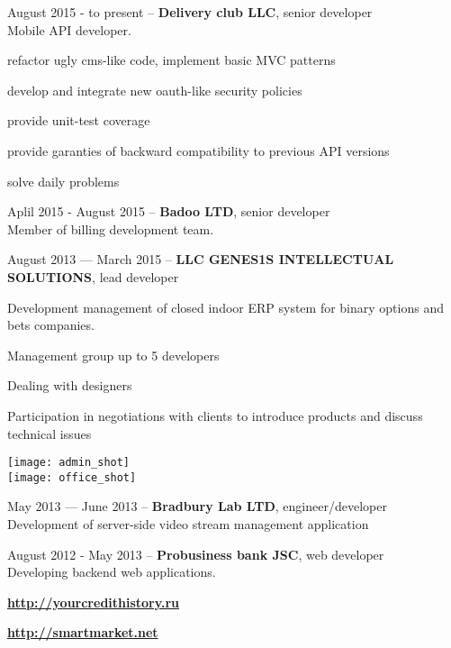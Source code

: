 \documentclass[10pt, a4paper, english]{article}
\begin{document}
\begin {list}{\textbullet}{}
  \item August 2015 - to present -- \textbf{Delivery club LLC}, senior developer\\
    Mobile API developer.
    \begin {list}{\textbullet}{}
      \item refactor ugly cms-like code, implement basic MVC patterns
      \item develop and integrate new oauth-like security policies
      \item provide unit-test coverage
      \item provide garanties of backward compatibility to previous API versions
      \item solve daily problems
    \end{list}

  \item Aplil 2015 - August 2015 -- \textbf{Badoo LTD}, senior developer\\
    Member of billing development team.

  \item August 2013 — March 2015 -- \textbf{LLC GENES1S INTELLECTUAL SOLUTIONS}, lead developer
    \begin {list}{\textbullet}{}
      \item Development management of closed indoor ERP system for binary options and bets companies.
      \item Management group up to 5 developers
      \item Dealing with designers
      \item Participation in negotiations with clients to introduce products and discuss technical issues
    \end{list}
    \texttt{[image: admin\_shot]}\\
    \texttt{[image: office\_shot]}

  \item May 2013 — June 2013 -- \textbf{Bradbury Lab LTD}, engineer/developer\\
    Development of server-side video stream management application

  \item August 2012 - May 2013 -- \textbf{Probusiness bank JSC}, web developer\\
    Developing backend web applications.
    \begin {list}{\textbullet}{}
      \item \textbf{\url{http://yourcredithistory.ru}}
      \item \textbf{\url{http://smartmarket.net}}
    \end {list}


\end{list}
\end{document}
